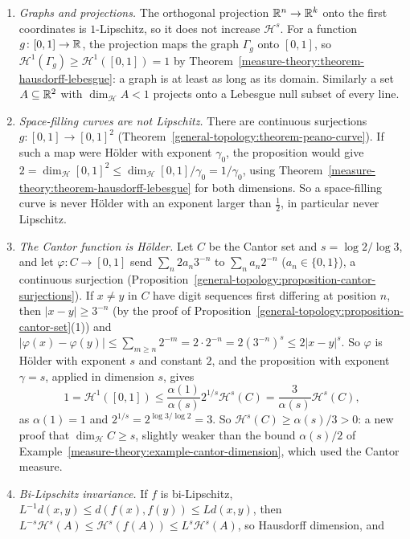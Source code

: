 \begin{example}\label{measure-theory:example-holder-images}
\begin{enumerate}
\item \emph{Graphs and projections.} The orthogonal projection $\mathbb{R}^n \to \mathbb{R}^k$ onto the first coordinates is $1$-Lipschitz, so it does not increase $\mathcal{H}^s$. For a function
$g \colon [0, 1] \to \mathbb{R}$, the projection maps the graph $\Gamma_g$ onto $[0, 1]$, so $\mathcal{H}^1(\Gamma_g) \geq \mathcal{H}^1([0, 1]) = 1$ by Theorem~\ref{measure-theory:theorem-hausdorff-lebesgue}: a graph is at least
as long as its domain. Similarly a set $A \subseteq \mathbb{R}^2$ with $\dim_{\mathcal{H}}A < 1$ projects onto a Lebesgue null subset of every line.
\item \emph{Space-filling curves are not Lipschitz.} There are continuous surjections $g \colon [0, 1] \to [0, 1]^2$ (Theorem~\ref{general-topology:theorem-peano-curve}). If such a map were H\"older with
exponent $\gamma_0$, the proposition would give $2 = \dim_{\mathcal{H}}[0, 1]^2 \leq \dim_{\mathcal{H}}[0, 1]/\gamma_0 = 1/\gamma_0$, using Theorem~\ref{measure-theory:theorem-hausdorff-lebesgue} for both dimensions. So a space-filling curve is
never H\"older with an exponent larger than $\frac12$, in particular never Lipschitz.
\item \emph{The Cantor function is H\"older.} Let $C$ be the Cantor set and $s = \log 2/\log 3$, and let $\varphi \colon C \to [0, 1]$ send $\sum_n2a_n3^{-n}$ to $\sum_na_n2^{-n}$ ($a_n \in \{0, 1\}$), a continuous
surjection (Proposition~\ref{general-topology:proposition-cantor-surjections}). If $x \neq y$ in $C$ have digit sequences first differing at position $n$, then $|x - y| \geq 3^{-n}$
(by the proof of Proposition~\ref{general-topology:proposition-cantor-set}(1)) and $|\varphi(x) - \varphi(y)| \leq \sum_{m \geq n}2^{-m} = 2 \cdot 2^{-n} = 2(3^{-n})^s \leq 2|x - y|^s$. So $\varphi$ is H\"older with exponent $s$
and constant $2$, and the proposition with exponent $\gamma = s$, applied in dimension $s$, gives
\[
1 = \mathcal{H}^1([0, 1]) \leq \frac{\alpha(1)}{\alpha(s)}2^{1/s}\mathcal{H}^s(C) = \frac{3}{\alpha(s)}\mathcal{H}^s(C),
\]
as $\alpha(1) = 1$ and $2^{1/s} = 2^{\log 3/\log 2} = 3$. So $\mathcal{H}^s(C) \geq \alpha(s)/3 > 0$: a new proof that $\dim_{\mathcal{H}}C \geq s$, slightly weaker than the bound $\alpha(s)/2$ of
Example~\ref{measure-theory:example-cantor-dimension}, which used the Cantor measure.
\item \emph{Bi-Lipschitz invariance.} If $f$ is bi-Lipschitz, $L^{-1}d(x, y) \leq d(f(x), f(y)) \leq Ld(x, y)$, then $L^{-s}\mathcal{H}^s(A) \leq \mathcal{H}^s(f(A)) \leq L^s\mathcal{H}^s(A)$, so Hausdorff dimension, and

\end{enumerate}
\end{example}
